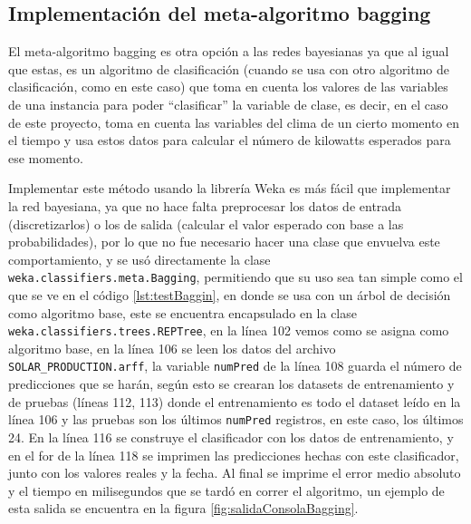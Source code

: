 \subsection{Implementación del meta-algoritmo bagging}
El meta-algoritmo bagging es otra opción a las redes bayesianas ya que al igual que estas, es un algoritmo de clasificación (cuando se usa con otro algoritmo de clasificación, como en este caso) que toma en cuenta los valores de las variables de una instancia para poder ``clasificar'' la variable de clase, es decir, en el caso de este proyecto, toma en cuenta las variables del clima de un cierto momento en el tiempo y usa estos datos para calcular el número de kilowatts esperados para ese momento.

Implementar este método usando la librería Weka es más fácil que implementar la red bayesiana, ya que no hace falta preprocesar los datos de entrada (discretizarlos) o los de salida (calcular el valor esperado con base a las probabilidades), por lo que no fue necesario hacer una clase que envuelva este comportamiento, y se usó directamente la clase \texttt{weka.classifiers.meta.Bagging}, permitiendo que su uso sea tan simple como el que se ve en el código \ref{lst:testBaggin}, 
en donde se usa con un árbol de decisión como algoritmo base, este se encuentra encapsulado en la clase \texttt{weka.classifiers.trees.REPTree}, en la línea 102 vemos como se asigna como algoritmo base, en la línea 106 se leen los datos del archivo \texttt{SOLAR\_PRODUCTION.arff}, 
la variable \texttt{numPred} de la línea 108 guarda el número de predicciones que se harán, según esto se crearan los datasets de entrenamiento y de pruebas (líneas 112, 113) donde el entrenamiento es todo el dataset leído en la línea 106 y las pruebas son los últimos \texttt{numPred} registros, en este caso, los últimos 24. 
En la línea 116 se construye el clasificador con los datos de entrenamiento, y en el for de la línea 118 se imprimen las predicciones hechas con este clasificador, junto con los valores reales y la fecha.
Al final se imprime el error medio absoluto y el tiempo en milisegundos que se tardó en correr el algoritmo, un ejemplo de esta salida se encuentra en la figura \ref{fig:salidaConsolaBagging}.


